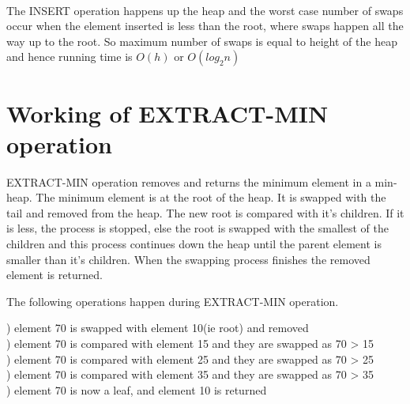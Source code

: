 \documentclass[11pt,a4paper]{amsart}
\theoremstyle{plain}
\numberwithin{equation}{section}
\begin{document}
\paragraph{}
\noindent The INSERT operation happens up the heap and the worst case number of swaps occur when the element inserted is less than the root, where swaps happen all the way up to the root. So maximum number of swaps is equal to height of the heap and hence running time is $O(h)$ or $O(log_2n)$ 

\section{\textbf{Working of EXTRACT-MIN operation}}
	EXTRACT-MIN operation removes and returns the minimum element in a min-heap. The minimum element is at the root of the heap. It is swapped with the tail and removed from the heap. The new root is compared with it's children. If it is less,  the process is stopped, else the root is swapped with the smallest of the children and this process continues down the heap until the parent element is smaller than it's children.  When the swapping process finishes the removed element is returned.

\indent The following operations happen during EXTRACT-MIN operation.

) element 70 is swapped with element 10(ie root) and removed\\
) element 70 is compared with element 15 and they are swapped as 70 > 15\\
) element 70 is compared with element 25 and they are swapped as 70 > 25\\
) element 70 is compared with element 35 and they are swapped as 70 > 35\\
) element 70 is now a leaf, and element 10 is returned
\end{document}
